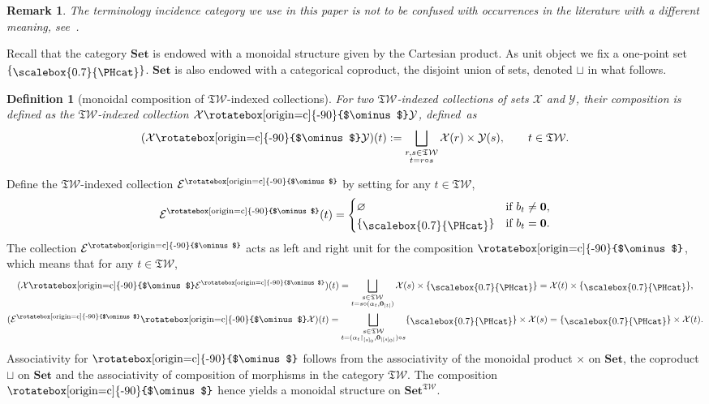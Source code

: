 \documentclass[pdftex]{sigma}
\newcommand\overt{\mathbin{\text{\rotatebox[origin=c]{-90}{$\ominus$}}}}
\renewcommand{\restriction}[2]{{#1\mathbin{\upharpoonright}_{#2}}}
\newcommand{\vertset}{{\overt}}
\newcommand{\SWc}{{\mathfrak{T}\mathcal{W}}}
\newcommand\CAT[1]{\mathbf{#1}}
\newcommand{\Set}{\CAT{Set}}
\newcommand{\Singleton}{\raisebox{-2pt}{\scalebox{0.7}{\PHcat}}}
\numberwithin{equation}{section}
\newtheorem{Definition}[Theorem]{Definition}
\newtheorem{Remark}[Theorem]{Remark}
\begin{document}
\begin{Remark} The terminology incidence category we use in this paper is not to be confused with occurrences in the literature with a different meaning, see~\cite{szczesny2011incidence}.
\end{Remark}

Recall that the category $\Set $ is endowed with a monoidal structure given by the Cartesian product. As unit object we fix a one-point set $\{\Singleton\}$.
$\Set$ is also endowed with a categorical coproduct, the disjoint union of sets, denoted $\displaystyle\sqcup$ in what follows.

\begin{Definition}[monoidal composition of $\SWc$-indexed collections]
	For two $\SWc$-indexed collections of sets $\mathcal{X}$ and $\mathcal{Y}$,
	their {\it composition} is defined as the $\SWc$-indexed collection
	$\mathcal{X}\vertset \mathcal{Y}$, defined~as
	\begin{equation*}
		(\mathcal{X}\vertset \mathcal{Y})(t)
		:= \bigsqcup_{\substack{r,s\in\SWc\\
		t = r \circ s}}
		\mathcal{X}(r) \times \mathcal{Y}(s), \qquad t \in \SWc.
	\end{equation*}
\end{Definition}
Define the $\SWc$-indexed collection $\mathcal{E}^\vertset$ by setting for any $t \in \SWc$,
\[\mathcal{E}^\vertset(t)=
\begin{cases}
 \varnothing &\text{if $b_t\neq \mathbf{0}$},\\
 \{\Singleton \} & \text{if $b_t= \mathbf{0}$}.
\end{cases}
\]
The collection $\mathcal{E}^\vertset$ acts as left and right unit for the composition $\vertset$, which means that for any $t \in \SWc$,
\begin{gather*}
	(\mathcal{X}\vertset \mathcal{E}^\vertset)(t) = \bigsqcup_{\substack{s\in \SWc \\ t=s\circ (\alpha_t,\mathbf{0}_{|t|})}} \mathcal{X}(s)\times \{\Singleton \} = \mathcal{X}(t) \times \{\Singleton \},
\\
	(\mathcal{E}^\vertset \vertset \mathcal{X})(t) = \bigsqcup_{\substack{s\in \SWc \\ t = (\restriction{\alpha_t}{[s]_0},\mathbf{0}_{|[s]_0|})\circ s}} \{\Singleton \} \times \mathcal{X}(s) = \{\Singleton \}\times \mathcal{X}(t).
\end{gather*}
Associativity for $\vertset$ follows from the associativity
of the monoidal product $\times$ on $\Set $, the coproduct $\sqcup$ on $\Set $
and the associativity of composition of morphisms in the category $\SWc$.
The composition $\vertset$ hence yields a monoidal structure on $\Set^{\SWc}$.
\end{document}
